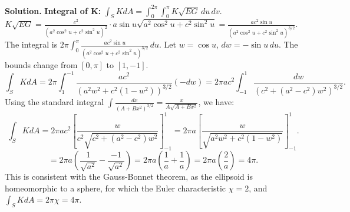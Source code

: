 \documentclass[12pt, a4paper, oneside]{article}
\newenvironment{solution}
  {\par\noindent\textbf{Solution. }\newline}
  {\par}
\begin{document}
\begin{solution}
\textbf{Integral of K:}
$\int_S K dA = \int_0^{2\pi} \int_0^\pi K \sqrt{EG} \,du\,dv$.
$K\sqrt{EG} = \frac{c^2}{(a^2 \cos^2 u + c^2 \sin^2 u)^2} \cdot a \sin u \sqrt{a^2 \cos^2 u + c^2 \sin^2 u} = \frac{ac^2 \sin u}{(a^2 \cos^2 u + c^2 \sin^2 u)^{3/2}}$.
The integral is $2\pi \int_0^\pi \frac{ac^2 \sin u}{(a^2 \cos^2 u + c^2 \sin^2 u)^{3/2}} \,du$.
Let $w = \cos u$, $dw = -\sin u \,du$. The bounds change from $[0, \pi]$ to $[1, -1]$.
$$ \int_S K dA = 2\pi \int_1^{-1} \frac{ac^2}{ (a^2 w^2 + c^2(1-w^2))^{3/2} } (-dw) = 2\pi ac^2 \int_{-1}^{1} \frac{dw}{(c^2+(a^2-c^2)w^2)^{3/2}}. $$
Using the standard integral $\int \frac{dx}{(A+Bx^2)^{3/2}} = \frac{x}{A\sqrt{A+Bx^2}}$, we have:
$$ \int_S K dA = 2\pi ac^2 \left[ \frac{w}{c^2\sqrt{c^2+(a^2-c^2)w^2}} \right]_{-1}^1 = 2\pi a \left[ \frac{w}{\sqrt{a^2w^2+c^2(1-w^2)}} \right]_{-1}^1. $$
$$ = 2\pi a \left( \frac{1}{\sqrt{a^2}} - \frac{-1}{\sqrt{a^2}} \right) = 2\pi a \left( \frac{1}{a} + \frac{1}{a} \right) = 2\pi a \left(\frac{2}{a}\right) = 4\pi. $$
This is consistent with the Gauss-Bonnet theorem, as the ellipsoid is homeomorphic to a sphere, for which the Euler characteristic $\chi=2$, and $\int_S K dA = 2\pi\chi = 4\pi$.
\end{solution}
\end{document}

